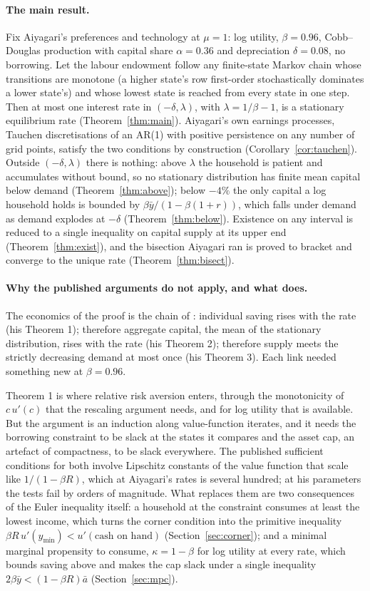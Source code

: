 \paragraph{The main result.}
Fix Aiyagari's preferences and technology at $\mu=1$: log utility, $\beta=0.96$, Cobb--Douglas
production with capital share $\alpha=0.36$ and depreciation $\delta=0.08$, no borrowing. Let the
labour endowment follow any finite-state Markov chain whose transitions are monotone (a higher
state's row first-order stochastically dominates a lower state's) and whose lowest state is reached
from every state in one step. Then at most one interest rate in $(-\delta,\lambda)$, with
$\lambda=1/\beta-1$, is a stationary equilibrium rate (Theorem~\ref{thm:main}). Aiyagari's own
earnings processes, Tauchen discretisations of an AR(1) with positive persistence on any number of
grid points, satisfy the two conditions by construction (Corollary~\ref{cor:tauchen}). Outside
$(-\delta,\lambda)$ there is nothing: above $\lambda$ the household is patient and accumulates
without bound, so no stationary distribution has finite mean capital below demand
(Theorem~\ref{thm:above}); below $-4\%$ the only capital a log household holds is bounded by
$\beta\bar y/(1-\beta(1+r))$, which falls under demand as demand explodes at $-\delta$
(Theorem~\ref{thm:below}). Existence on any interval is reduced to a single inequality on capital
supply at its upper end (Theorem~\ref{thm:exist}), and the bisection Aiyagari ran is proved to
bracket and converge to the unique rate (Theorem~\ref{thm:bisect}).

\paragraph{Why the published arguments do not apply, and what does.}
The economics of the proof is the chain of \citet{Light2020}: individual saving rises with the
rate (his Theorem 1); therefore aggregate capital, the mean of the stationary distribution, rises
with the rate (his Theorem 2); therefore supply meets the strictly decreasing demand at most once
(his Theorem 3). Each link needed something new at $\beta=0.96$.

Theorem 1 is where relative risk aversion enters, through the monotonicity of $c\,u'(c)$ that the
rescaling argument needs, and for log utility that is available. But the argument is an induction
along value-function iterates, and it needs the borrowing constraint to be slack at the states it
compares and the asset cap, an artefact of compactness, to be slack everywhere. The published
sufficient conditions for both involve Lipschitz constants of the value function that scale like
$1/(1-\beta R)$, which at Aiyagari's rates is several hundred; at his parameters the tests fail by
orders of magnitude. What replaces them are two consequences of the Euler inequality itself: a
household at the constraint consumes at least the lowest income, which turns the corner condition
into the primitive inequality $\beta R\,u'(y_{\min})<u'(\text{cash on hand})$
(Section~\ref{sec:corner}); and a minimal marginal propensity to consume, $\kappa=1-\beta$ for log
utility at every rate, which bounds saving above and makes the cap slack under a single inequality
$2\beta\bar y<(1-\beta R)\bar a$ (Section~\ref{sec:mpc}).

